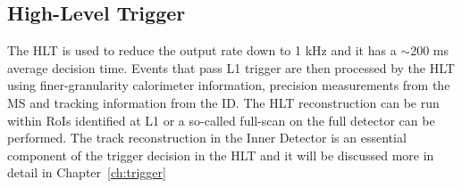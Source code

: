 		\subsection{High-Level Trigger}

			The HLT is used to reduce the output rate down to 1 kHz and it has a $\sim$200 ms average decision time. Events that pass L1 trigger are then processed by the HLT using finer-granularity calorimeter information, precision measurements from the MS and tracking information from the ID. The HLT reconstruction can be run within RoIs identified at L1 or a so-called full-scan on the full detector can be performed. The track reconstruction in the Inner Detector is an essential component of the trigger decision in the HLT and it will be discussed more in detail in Chapter~\ref{ch:trigger}







